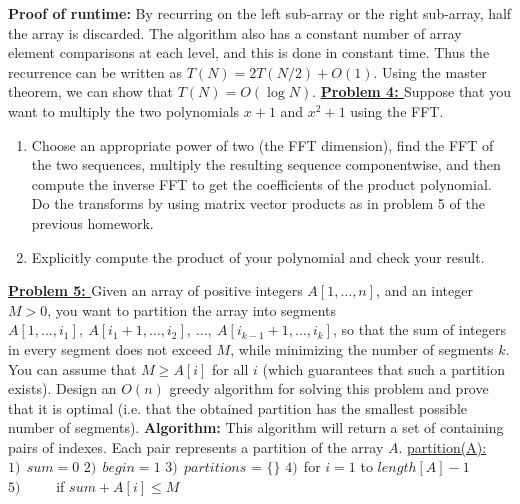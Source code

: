 \documentclass[11pt]{article}
\begin{document}
\begin{flushleft}
	\newline
	\newline
	\textbf{Proof of runtime: }By recurring on the left sub-array or the right sub-array, half the array is discarded. The algorithm also has a constant number of array element comparisons at each level, and this is done in constant time. Thus the recurrence can be written as $T(N) = 2T(N / 2) + O(1)$. Using the master theorem, we can show that $T(N) = O(\log N)$.
	\newpage
	\textbf{\underline{Problem 4: }}Suppose that you want to multiply the two polynomials $x + 1$ and $x^2 + 1$
	using the FFT. 
	\begin{enumerate}
		\item 
		Choose an appropriate power of two (the FFT dimension), find the FFT of the
		two sequences, multiply the resulting sequence
		componentwise, and then compute the
		inverse FFT to get the coefficients of the product polynomial.
		Do the transforms by using matrix vector products
		as in problem 5 of the previous homework.
		\item
		Explicitly compute the product of your polynomial and check
		your result.
	\end{enumerate}
	\newpage
	\textbf{\underline{Problem 5: }}Given an array of positive integers $A[1,\dots,n]$, and an integer
	$M>0$, you want to partition the array into segments $A[1,\dots,i_1],\
	A[i_1+1,\dots,i_2],\ \dots,\ A[i_{k-1}+1,\dots,i_k]$, so that the sum of
	integers in every segment does not exceed $M$, while minimizing the
	number of segments $k$. You can assume that $M\geq A[i]$ for all $i$
	(which guarantees that such a partition exists). Design an $O(n)$ greedy
	algorithm for solving this problem and prove that it is optimal
	(i.e. that the obtained partition has the smallest possible number of segments).
	\newline
	\newline
	\textbf{Algorithm: } This algorithm will return a set of containing pairs of indexes. Each pair represents a partition of the array $A$.
	\newline
	\newline
	\underline{partition(A):}
	\newline
	$1)\ \ sum = 0$ 	\newline
	$2)\ \ begin = 1$	\newline
	$3)\ \ partitions$ = $\lbrace \rbrace$
	\newline
	$4)\ \ $for $i = 1$ to $length[A] - 1$ \newline
	$5)\ \qquad$ if $sum + A[i] \leq M$   \newline

\end{flushleft}
\end{document}
